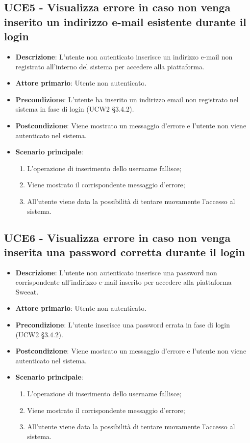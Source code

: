 \subsection{UCE5 - Visualizza errore in caso non venga inserito un indirizzo e-mail esistente durante il login}
\begin{itemize}
\item \textbf{Descrizione}: L'utente non autenticato inserisce un indirizzo e-mail non registrato all'interno del sistema per accedere alla piattaforma.
\item \textbf{Attore primario}: Utente non autenticato.
\item \textbf{Precondizione}: L'utente ha inserito un indirizzo email non registrato nel sistema in fase di login (UCW2 §3.4.2).
\item \textbf{Postcondizione}: Viene mostrato un messaggio d'errore e l'utente non viene autenticato nel sistema.

\item \textbf{Scenario principale}:
\begin{enumerate}
\item L'operazione di inserimento dello username fallisce;
\item Viene mostrato il corrispondente messaggio d'errore;
\item All'utente viene data la possibilità di tentare nuovamente l'accesso al sistema.
\end{enumerate}
\end{itemize}

\subsection{UCE6 - Visualizza errore in caso non venga inserita una password corretta durante il login}
\begin{itemize}
\item \textbf{Descrizione}: L'utente non autenticato inserisce una password non corrispondente all'indirizzo e-mail inserito per accedere alla piattaforma Sweeat.
\item \textbf{Attore primario}: Utente non autenticato.
\item \textbf{Precondizione}: L'utente inserisce una password errata in fase di login (UCW2 §3.4.2).
\item \textbf{Postcondizione}: Viene mostrato un messaggio d'errore e l'utente non viene autenticato nel sistema.

\item \textbf{Scenario principale}:
\begin{enumerate}
\item L'operazione di inserimento dello username fallisce;
\item Viene mostrato il corrispondente messaggio d'errore;
\item All'utente viene data la possibilità di tentare nuovamente l'accesso al sistema.
\end{enumerate}
\end{itemize}

